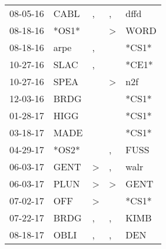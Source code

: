 \begin{supertabular}{p{0.07\textwidth}p{0.06\textwidth}p{0.02\textwidth}p{0.02\textwidth}p{0.06\textwidth}}
          08-05-16\textsuperscript{} &           CABL\textsuperscript{} &                , &                , &           dffd\textsuperscript{} \\
          08-18-16\textsuperscript{} &                            *OS1* &                  &     \textgreater &           WORD\textsuperscript{} \\
          08-18-16\textsuperscript{} &           arpe\textsuperscript{} &                , &                  &                            *CS1* \\
          10-27-16\textsuperscript{} &           SLAC\textsuperscript{} &                , &                  &                            *CE1* \\
          10-27-16\textsuperscript{} &           SPEA\textsuperscript{} &                  &     \textgreater &            n2f\textsuperscript{} \\
          12-03-16\textsuperscript{} &           BRDG\textsuperscript{} &                  &                  &                            *CS1* \\
          01-28-17\textsuperscript{} &           HIGG\textsuperscript{} &                  &                  &                            *CS1* \\
          03-18-17\textsuperscript{} &           MADE\textsuperscript{} &                  &                  &                            *CS1* \\
          04-29-17\textsuperscript{} &                            *OS2* &                  &                , &           FUSS\textsuperscript{} \\
          06-03-17\textsuperscript{} &           GENT\textsuperscript{} &     \textgreater &                , &           walr\textsuperscript{} \\
          06-03-17\textsuperscript{} &           PLUN\textsuperscript{} &     \textgreater &     \textgreater &           GENT\textsuperscript{} \\
          07-02-17\textsuperscript{} &            OFF\textsuperscript{} &     \textgreater &                  &                            *CS1* \\
          07-22-17\textsuperscript{} &           BRDG\textsuperscript{} &                , &                , &           KIMB\textsuperscript{} \\
          08-18-17\textsuperscript{} &           OBLI\textsuperscript{} &                , &                , &            DEN\textsuperscript{} \\

\end{supertabular}
